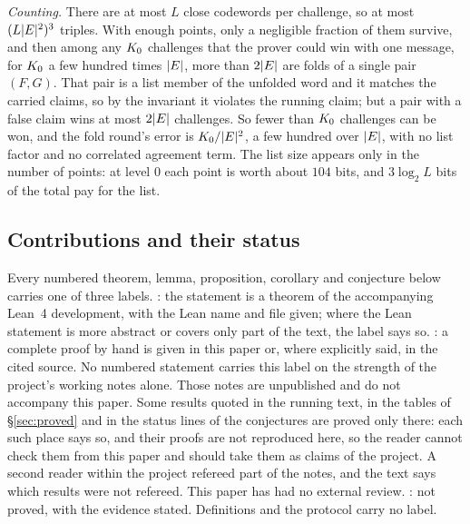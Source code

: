 \emph{Counting.} There are at most $L$ close codewords per challenge, so at most $(L|E|^2)^3$ triples. With enough points, only a negligible fraction of them survive, and then among any $K_0$ challenges that the prover could win with one message, for $K_0$ a few hundred times $|E|$, more than $2|E|$ are folds of a single pair $(F,G)$. That pair is a list member of the unfolded word and it matches the carried claims, so by the invariant it violates the running claim; but a pair with a false claim wins at most $2|E|$ challenges. So fewer than $K_0$ challenges can be won, and the fold round's error is $K_0/|E|^2$, a few hundred over $|E|$, with no list factor and no correlated agreement term. The list size appears only in the number of points: at level $0$ each point is worth about $104$ bits, and $3\log_2L$ bits of the total pay for the list.

\subsection{Contributions and their status}\label{sec:contrib}

Every numbered theorem, lemma, proposition, corollary and conjecture below carries one of three labels. \stmc: the statement is a theorem of the accompanying Lean~4 development, with the Lean name and file given; where the Lean statement is more abstract or covers only part of the text, the label says so. \stpr: a complete proof by hand is given in this paper or, where explicitly said, in the cited source. No numbered statement carries this label on the strength of the project's working notes alone. Those notes are unpublished and do not accompany this paper. Some results quoted in the running text, in the tables of \S\ref{sec:proved} and in the status lines of the conjectures are proved only there: each such place says so, and their proofs are not reproduced here, so the reader cannot check them from this paper and should take them as claims of the project. A second reader within the project refereed part of the notes, and the text says which results were not refereed. This paper has had no external review. \stcj: not proved, with the evidence stated. Definitions and the protocol carry no label.

